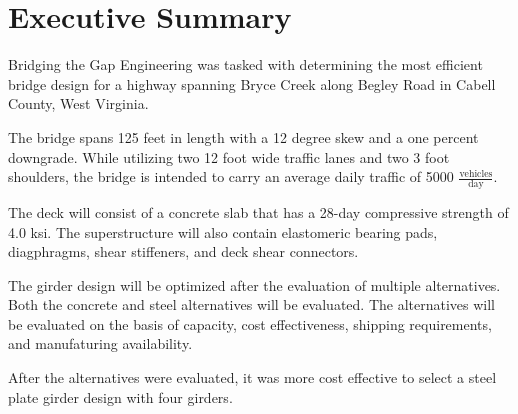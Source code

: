 \thispagestyle{plain}
\section*{Executive Summary}
Bridging the Gap Engineering was tasked with determining the most efficient bridge design for a highway spanning Bryce Creek along Begley Road in Cabell County, West Virginia.

The bridge spans 125 feet in length with a 12 degree skew and a one percent downgrade. While utilizing two 12 foot wide traffic lanes and two 3 foot shoulders, the bridge is intended to carry an average daily traffic of 5000 \(\frac{\textrm{vehicles}}{\textrm{day}}\).

The deck will consist of a concrete slab that has a 28-day compressive strength of 4.0 ksi. The superstructure will also contain elastomeric bearing pads, diagphragms, shear stiffeners, and deck shear connectors.

The girder design will be optimized after the evaluation of multiple alternatives. Both the concrete and steel alternatives will be evaluated. The alternatives will be evaluated on the basis of capacity, cost effectiveness, shipping requirements, and manufaturing availability.

After the alternatives were evaluated, it was more cost effective to select a steel plate girder design with four girders.

\newpage